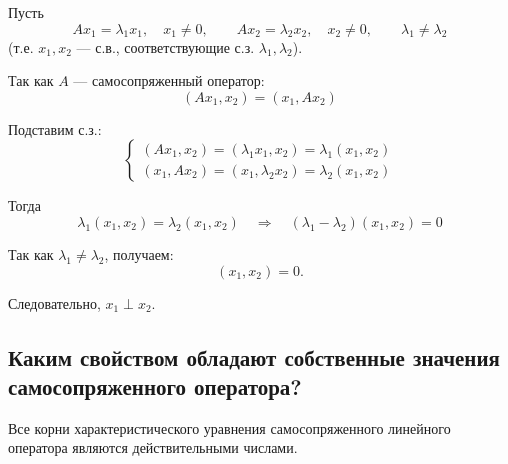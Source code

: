 \begin{Proof}
    Пусть
    \[
        Ax_1 = \lambda_1 x_1,\quad x_1 \neq 0,\qquad
        Ax_2 = \lambda_2 x_2,\quad x_2 \neq 0,\qquad
        \lambda_1 \neq \lambda_2
    \]
    (т.е. $x_1,x_2$ --- с.в., соответствующие с.з. $\lambda_1, \lambda_2$).

    Так как $A$ --- самосопряженный оператор:
    \[
        (Ax_1,x_2) = (x_1,Ax_2)
    \]

    Подставим с.з.:
    \[
    \begin{cases}
        (Ax_1,x_2) = (\lambda_1 x_1, x_2) = \lambda_1 (x_1,x_2) \\
        (x_1, Ax_2) = (x_1, \lambda_2 x_2) = \lambda_2 (x_1,x_2)
    \end{cases}
    \]

    Тогда
    \[
        \lambda_1 (x_1,x_2) = \lambda_2 (x_1,x_2) \quad \Rightarrow \quad (\lambda_1-\lambda_2)(x_1,x_2) = 0
    \]

    Так как $\lambda_1 \neq \lambda_2$, получаем:
    \[
        (x_1,x_2) = 0.
    \]

    Следовательно, $x_1 \perp x_2$.
\end{Proof}
\subsection{Каким свойством обладают собственные значения самосопряженного оператора?}

\begin{theorem}
    Все корни характеристического уравнения самосопряженного линейного оператора являются действительными числами.
\end{theorem}

